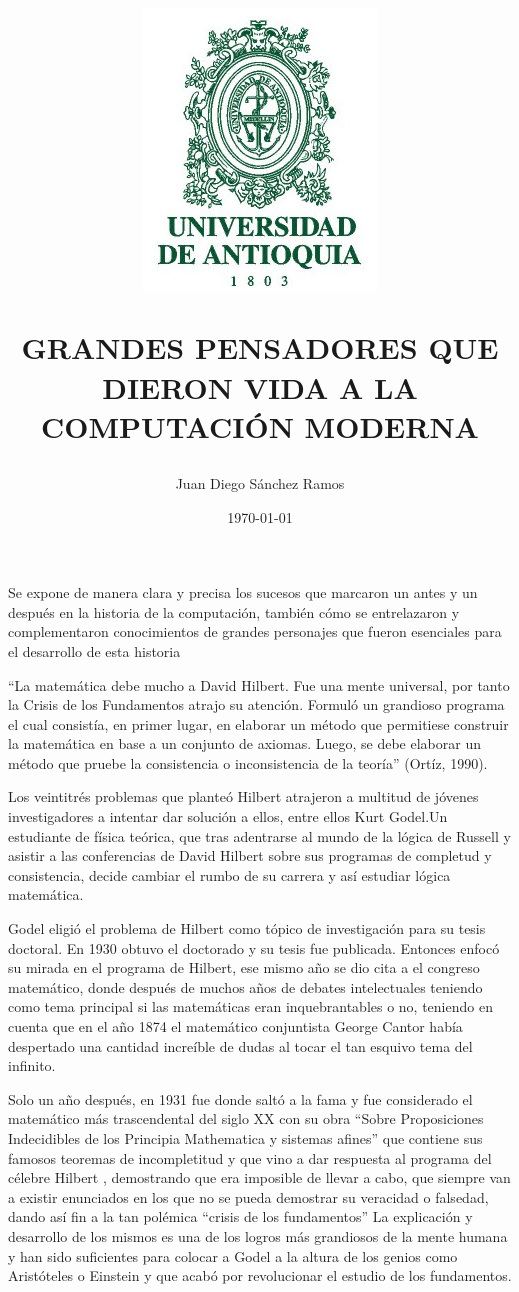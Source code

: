 \documentclass{article}
\title{      \includegraphics[scale=0.5]{logo-universidad-de-antioquia.png}

GRANDES PENSADORES QUE DIERON VIDA A LA COMPUTACIÓN MODERNA}
\author{Juan Diego Sánchez Ramos
}
\date{\today}
\begin{document}
\maketitle 

Se expone de manera clara y precisa los sucesos que marcaron un antes y un después en la historia de la computación, también cómo se entrelazaron y complementaron conocimientos de grandes personajes que fueron esenciales para el desarrollo de esta historia

“La matemática debe mucho a David Hilbert. Fue una mente universal,  por tanto la Crisis de los Fundamentos atrajo su atención. Formuló un grandioso programa  el cual consistía, en primer lugar, en elaborar un método que permitiese construir la matemática en base a un conjunto de axiomas. Luego, se debe elaborar un método que pruebe la consistencia o inconsistencia de la teoría” (Ortíz, 1990). \cite{ortizcrisis}

Los veintitrés problemas que planteó Hilbert atrajeron a multitud de jóvenes investigadores a intentar dar solución a ellos, entre ellos Kurt Godel.Un estudiante de física teórica, que tras adentrarse al mundo de la lógica de Russell y asistir a las conferencias de David Hilbert sobre sus programas de completud y consistencia, decide cambiar el rumbo de su carrera y así estudiar lógica matemática.

Godel eligió el problema de Hilbert como tópico de investigación para su tesis doctoral.
En 1930 obtuvo el doctorado y su tesis fue publicada. Entonces enfocó su mirada en el programa de Hilbert, ese mismo año se dio cita a el congreso matemático, donde después de muchos años de debates intelectuales teniendo como tema principal si las matemáticas eran inquebrantables o no,  teniendo en cuenta que en el año 1874 el matemático conjuntista George Cantor había despertado una cantidad increíble de dudas al tocar el tan esquivo tema del infinito.
 
Solo un año después, en 1931 fue donde saltó a la fama y fue considerado el matemático más trascendental del siglo XX  con su obra “Sobre Proposiciones Indecidibles de los Principia Mathematica y sistemas afines” que contiene sus famosos teoremas de incompletitud  y que vino a dar respuesta al programa del célebre  Hilbert , demostrando que  era imposible de llevar a cabo, que siempre van a existir enunciados en los que no se pueda demostrar su veracidad o falsedad, dando así fin a la tan polémica “crisis de los fundamentos” La explicación y desarrollo de los mismos es una de los logros más grandiosos de la mente humana y han sido suficientes para colocar a Godel a la altura de los genios como Aristóteles o Einstein y que acabó por revolucionar el estudio de los fundamentos.
 
\end{document}
